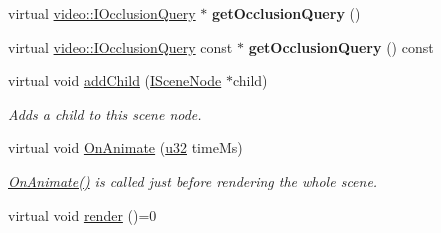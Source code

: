 \begin{DoxyCompactItemize}
\item 
virtual \hyperlink{classirr_1_1video_1_1IOcclusionQuery}{video\+::\+I\+Occlusion\+Query} $\ast$ {\bfseries get\+Occlusion\+Query} ()\hypertarget{classirr_1_1scene_1_1ISceneNode_a793877c9a60e5c63b3a349557d51fb08}{}\label{classirr_1_1scene_1_1ISceneNode_a793877c9a60e5c63b3a349557d51fb08}

\item 
virtual \hyperlink{classirr_1_1video_1_1IOcclusionQuery}{video\+::\+I\+Occlusion\+Query} const $\ast$ {\bfseries get\+Occlusion\+Query} () const \hypertarget{classirr_1_1scene_1_1ISceneNode_a2da44d4d0bb420bbedfbf74da53f1f5f}{}\label{classirr_1_1scene_1_1ISceneNode_a2da44d4d0bb420bbedfbf74da53f1f5f}

\item 
virtual void \hyperlink{classirr_1_1scene_1_1ISceneNode_acceef4fbb68f6cc7bb40035225350970}{add\+Child} (\hyperlink{classirr_1_1scene_1_1ISceneNode}{I\+Scene\+Node} $\ast$child)
\begin{DoxyCompactList}\small\item\em Adds a child to this scene node. \end{DoxyCompactList}\item 
virtual void \hyperlink{classirr_1_1scene_1_1ISceneNode_afc1dcb5cb19116d0c7aa3d4ebdf04cc5}{On\+Animate} (\hyperlink{namespaceirr_a0416a53257075833e7002efd0a18e804}{u32} time\+Ms)
\begin{DoxyCompactList}\small\item\em \hyperlink{classirr_1_1scene_1_1ISceneNode_afc1dcb5cb19116d0c7aa3d4ebdf04cc5}{On\+Animate()} is called just before rendering the whole scene. \end{DoxyCompactList}\item 
virtual void \hyperlink{classirr_1_1scene_1_1ISceneNode_aff530cc4856792101d0aedee51ce35fa}{render} ()=0\hypertarget{classirr_1_1scene_1_1ISceneNode_aff530cc4856792101d0aedee51ce35fa}{}\label{classirr_1_1scene_1_1ISceneNode_aff530cc4856792101d0aedee51ce35fa}


\end{DoxyCompactItemize}
